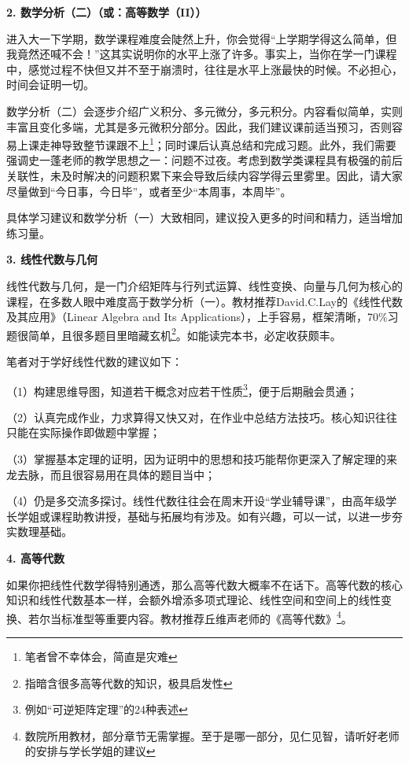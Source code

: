 \documentclass[11pt,oneside]{book}
\begin{document}
\textbf{2. 数学分析（二）（或：高等数学（II））}

进入大一下学期，数学课程难度会陡然上升，你会觉得“上学期学得这么简单，但我竟然还喊不会！”这其实说明你的水平上涨了许多。事实上，当你在学一门课程中，感觉过程不快但又并不至于崩溃时，往往是水平上涨最快的时候。不必担心，时间会证明一切。

数学分析（二）会逐步介绍广义积分、多元微分，多元积分。内容看似简单，实则丰富且变化多端，尤其是多元微积分部分。因此，我们建议课前适当预习，否则容易上课走神导致整节课跟不上\footnote{笔者曾不幸体会，简直是灾难}；同时课后认真总结和完成习题。此外，我们需要强调史一蓬老师的教学思想之一：问题不过夜。考虑到数学类课程具有极强的前后关联性，未及时解决的问题积累下来会导致后续内容学得云里雾里。因此，请大家尽量做到“今日事，今日毕”，或者至少“本周事，本周毕”。

具体学习建议和数学分析（一）大致相同，建议投入更多的时间和精力，适当增加练习量。

\vspace{20pt}

\textbf{3. 线性代数与几何} 

线性代数与几何，是一门介绍矩阵与行列式运算、线性变换、向量与几何为核心的课程，在多数人眼中难度高于数学分析（一）。教材推荐David.C.Lay的《线性代数及其应用》（Linear Algebra and Its Applications），上手容易，框架清晰，70\%习题很简单，且很多题目里暗藏玄机\footnote{指暗含很多高等代数的知识，极具启发性}。如能读完本书，必定收获颇丰。

\vspace{20pt}

笔者对于学好线性代数的建议如下：

（1）构建思维导图，知道若干概念对应若干性质\footnote{例如“可逆矩阵定理”的24种表述}，便于后期融会贯通；

（2）认真完成作业，力求算得又快又对，在作业中总结方法技巧。核心知识往往只能在实际操作即做题中掌握；

（3）掌握基本定理的证明，因为证明中的思想和技巧能帮你更深入了解定理的来龙去脉，而且很容易用在具体的题目当中；

（4）仍是多交流多探讨。线性代数往往会在周末开设“学业辅导课”，由高年级学长学姐或课程助教讲授，基础与拓展均有涉及。如有兴趣，可以一试，以进一步夯实数理基础。

\vspace{20pt}

\textbf{4. 高等代数}

如果你把线性代数学得特别通透，那么高等代数大概率不在话下。高等代数的核心知识和线性代数基本一样，会额外增添多项式理论、线性空间和空间上的线性变换、若尔当标准型等重要内容。教材推荐丘维声老师的《高等代数》\footnote{数院所用教材，部分章节无需掌握。至于是哪一部分，见仁见智，请听好老师的安排与学长学姐的建议}。
\end{document}
